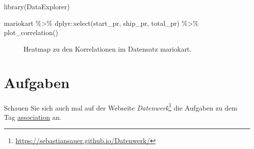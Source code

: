 \documentclass[
  letterpaper,
]{scrbook}
\newenvironment{Shaded}{\begin{snugshade}}{\end{snugshade}}
\newcommand{\FunctionTok}[1]{\textcolor[rgb]{0.28,0.35,0.67}{#1}}
\newcommand{\NormalTok}[1]{\textcolor[rgb]{0.00,0.23,0.31}{#1}}
\newcommand{\SpecialCharTok}[1]{\textcolor[rgb]{0.37,0.37,0.37}{#1}}
\theoremstyle{definition}
\theoremstyle{definition}
\theoremstyle{definition}
\theoremstyle{remark}
\begin{document}
\begin{Shaded}
\begin{Highlighting}[]
\FunctionTok{library}\NormalTok{(DataExplorer)}

\NormalTok{mariokart }\SpecialCharTok{\%\textgreater{}\%} 
\NormalTok{  dplyr}\SpecialCharTok{::}\FunctionTok{select}\NormalTok{(start\_pr, ship\_pr, total\_pr) }\SpecialCharTok{\%\textgreater{}\%} 
  \FunctionTok{plot\_correlation}\NormalTok{()}
\end{Highlighting}
\end{Shaded}

\begin{figure}[H]


\caption{\label{fig-mario-corr-pdf}Heatmap zu den Korrelationen im
Datensatz mariokart.}

\end{figure}%

\section{Aufgaben}\label{aufgaben-6}

Schauen Sie sich auch mal auf der Webseite \emph{Datenwerk}\footnote{\url{https://sebastiansauer.github.io/Datenwerk/}}
die Aufgaben zu dem Tag
\href{https://sebastiansauer.github.io/Datenwerk/\#category=association}{association}
an.
\end{document}
